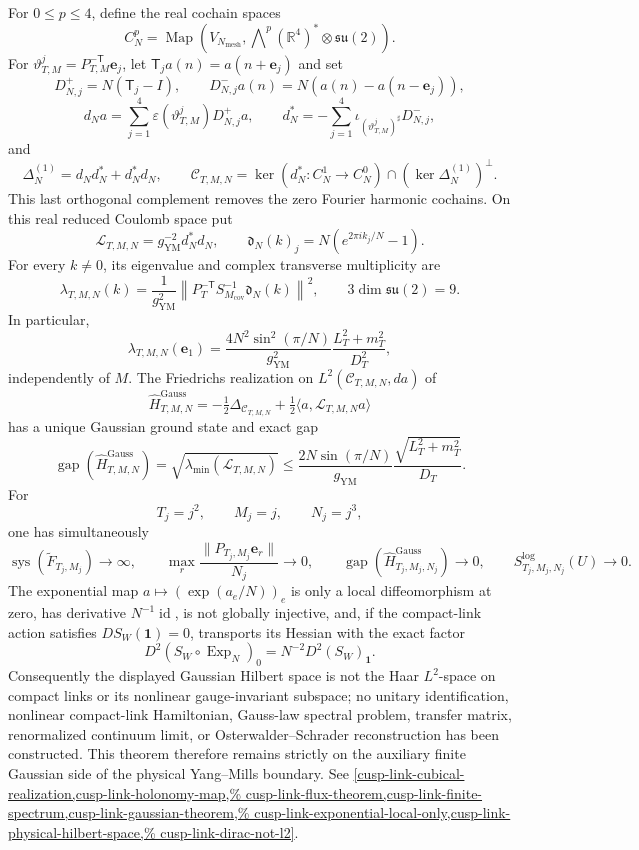 \begin{enumerate}[leftmargin=1.8em,itemsep=.65em]
For \(0\le p\le4\), define the real cochain spaces
\[
 C_N^p
 =\operatorname{Map}\!\left(
 V_{N_{\mathrm{mesh}}},
 \bigwedge\nolimits^p(\mathbb R^4)^*\otimes\mathfrak{su}(2)\right).
\]
For \(\vartheta^j_{T,M}=P_{T,M}^{-\mathsf T}\mathbf e_j\), let
\(\mathsf T_j a(n)=a(n+\mathbf e_j)\) and set
\[
 D^+_{N,j}=N(\mathsf T_j-I),
 \qquad D^-_{N,j}a(n)=N(a(n)-a(n-\mathbf e_j)),
\]
\[
 d_Na=\sum_{j=1}^4
 \varepsilon(\vartheta^j_{T,M})D^+_{N,j}a,
 \qquad
 d_N^*=-\sum_{j=1}^4
 \iota_{(\vartheta^j_{T,M})^\sharp}D^-_{N,j},
\]
and
\[
 \Delta_N^{(1)}=d_Nd_N^*+d_N^*d_N,
 \qquad
 \mathscr C_{T,M,N}
 =\ker(d_N^*:C_N^1\to C_N^0)
 \cap(\ker\Delta_N^{(1)})^\perp.
\]
This last orthogonal complement removes the zero Fourier harmonic cochains.
On this real reduced Coulomb space put
\[
 \mathcal L_{T,M,N}=g_{\mathrm{YM}}^{-2}d_N^*d_N,
 \qquad \mathfrak d_N(k)_j=N(e^{2\pi ik_j/N}-1).
\]
For every \(k\ne0\), its eigenvalue and complex transverse multiplicity are
\[
 \lambda_{T,M,N}(k)=\frac1{g_{\mathrm{YM}}^2}
 \left\lVert P_T^{-\mathsf T}S_{M_{\mathrm{cov}}}^{-1}
 \mathfrak d_N(k)\right\rVert^2,
 \qquad 3\dim\mathfrak{su}(2)=9.
\]
In particular,
\[
 \lambda_{T,M,N}(\mathbf e_1)
 =\frac{4N^2\sin^2(\pi/N)}{g_{\mathrm{YM}}^2}
  \frac{L_T^2+m_T^2}{D_T^2},
\]
independently of \(M\).  The Friedrichs realization on
\(L^2(\mathscr C_{T,M,N},da)\) of
\[
 \widehat H^{\mathrm{Gauss}}_{T,M,N}
 =-\tfrac12\Delta_{\mathscr C_{T,M,N}}
  +\tfrac12\langle a,\mathcal L_{T,M,N}a\rangle
\]
has a unique Gaussian ground state and exact gap
\[
 \operatorname{gap}(\widehat H^{\mathrm{Gauss}}_{T,M,N})
 =\sqrt{\lambda_{\min}(\mathcal L_{T,M,N})}
 \le\frac{2N\sin(\pi/N)}{g_{\mathrm{YM}}}
       \frac{\sqrt{L_T^2+m_T^2}}{D_T}.
\]
For
\[
 T_j=j^2,\qquad M_j=j,\qquad N_j=j^3,
\]
one has simultaneously
\[
 \operatorname{sys}(\widetilde F_{T_j,M_j})\to\infty,
 \qquad
 \max_r\frac{\lVert P_{T_j,M_j}\mathbf e_r\rVert}{N_j}\to0,
 \qquad
 \operatorname{gap}(\widehat H^{\mathrm{Gauss}}_{T_j,M_j,N_j})\to0,
 \qquad
 S^{\log}_{T_j,M_j,N_j}(U)\to0.
\]
The exponential map \(a\mapsto(\exp(a_e/N))_e\) is only a local
diffeomorphism at zero, has derivative \(N^{-1}\operatorname{id}\), is not
globally injective, and, if the compact-link action satisfies
\(DS_W(\mathbf1)=0\), transports its Hessian with the exact factor
\[
 D^2(S_W\circ\operatorname{Exp}_N)_0
 =N^{-2}D^2(S_W)_{\mathbf1}.
\]
Consequently the displayed Gaussian Hilbert space is
not the Haar \(L^2\)-space on compact links or its nonlinear gauge-invariant
subspace; no unitary identification, nonlinear compact-link Hamiltonian,
Gauss-law spectral problem, transfer matrix, renormalized continuum limit,
or Osterwalder--Schrader reconstruction has been constructed.  This theorem
therefore remains strictly on the auxiliary finite Gaussian side of the
physical Yang--Mills boundary.  See
 \cref{cusp-link-cubical-realization,cusp-link-holonomy-map,%
 cusp-link-flux-theorem,cusp-link-finite-spectrum,cusp-link-gaussian-theorem,%
 cusp-link-exponential-local-only,cusp-link-physical-hilbert-space,%
 cusp-link-dirac-not-l2}.


\end{enumerate}
